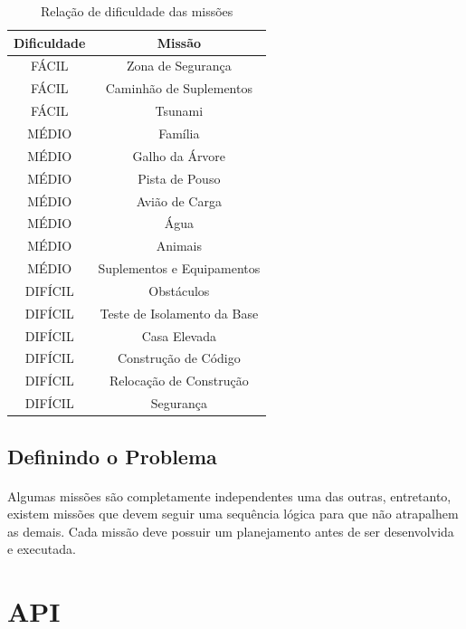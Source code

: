 \documentclass[12pt,a4paper]{article}
\begin{document}
		\begin{table}[h!]
			\begin{center}
				\begin{tabular}{cc}
					\toprule
						Dificuldade & Missão\\
					\midrule
						FÁCIL & Zona de Segurança\\
					    FÁCIL & Caminhão de Suplementos\\
					    FÁCIL & Tsunami\\
					    MÉDIO & Família\\
					    MÉDIO & Galho da Árvore\\
					    MÉDIO & Pista de Pouso\\
					    MÉDIO & Avião de Carga\\
					    MÉDIO & Água\\
					    MÉDIO & Animais\\
					    MÉDIO & Suplementos e Equipamentos\\
						DIFÍCIL & Obstáculos\\
					    DIFÍCIL & Teste de Isolamento da Base\\
					    DIFÍCIL & Casa Elevada\\
					    DIFÍCIL & Construção de Código\\
					    DIFÍCIL & Relocação de Construção\\
					    DIFÍCIL & Segurança\\
				    \bottomrule
				\end{tabular}
				\caption{Relação de dificuldade das missões}
				\label{tab:table_dificulty}
			\end{center}
		\end{table}

	\subsection{Definindo o Problema}
		\paragraph{}
			Algumas missões são completamente independentes uma das outras, 
			entretanto, existem missões que devem seguir uma sequência lógica 
			para que não atrapalhem as demais. Cada missão deve possuir um 
			planejamento antes de ser desenvolvida e executada.

\newpage
\section{API}
\end{document}
